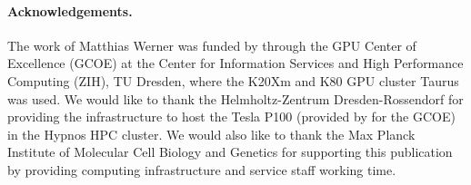 \paragraph{Acknowledgements.} The work of Matthias Werner was funded by \nvidia{} through the GPU Center of Excellence (GCOE) at the Center for Information Services and High Performance Computing (ZIH), TU Dresden, where the K20Xm and K80 GPU cluster Taurus was used. We would like to thank the Helmholtz-Zentrum Dresden-Rossendorf for providing the infrastructure to host the \nvidia{} Tesla P100 (provided by \nvidia{} for the GCOE) in the Hypnos HPC cluster. We would also like to thank the Max Planck Institute of Molecular Cell Biology and Genetics for supporting this publication by providing computing infrastructure and service staff working time.
